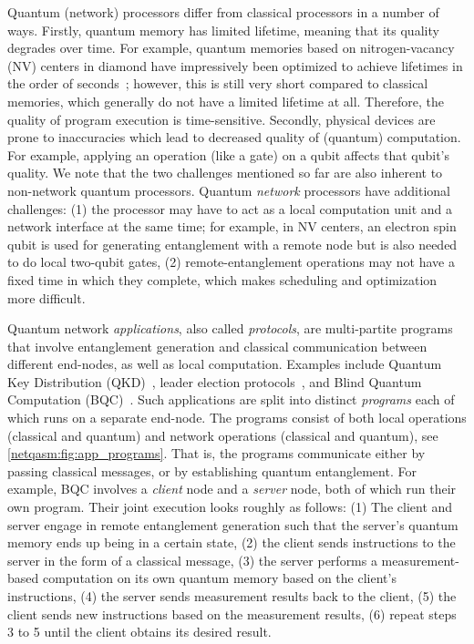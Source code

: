 Quantum (network) processors differ from classical processors in a number of ways.
Firstly, quantum memory has limited lifetime, meaning that its quality degrades over time.
For example, quantum memories based on nitrogen-vacancy (NV) centers in diamond have impressively been optimized to achieve lifetimes in the order of seconds~\cite{Abobeih2018}; however, this is still very short compared to classical memories, which generally do not have a limited lifetime at all.
Therefore, the quality of program execution is time-sensitive.
Secondly, physical devices are prone to inaccuracies which lead to decreased quality of (quantum) computation.
For example, applying an operation (like a gate) on a qubit affects that qubit's quality.
We note that the two challenges mentioned so far are also inherent to non-network quantum processors.
Quantum \textit{network} processors have additional challenges:
(1) the processor may have to act as a local computation unit and a network interface at the same time;
for example, in NV centers, an electron spin qubit is used for generating entanglement with a remote node but is also needed to do local two-qubit gates,
(2) remote-entanglement operations may not have a fixed time in which they complete, which makes scheduling and optimization more difficult.

Quantum network \textit{applications}, also called \textit{protocols}, are multi-partite programs that involve entanglement generation and classical communication between different end-nodes, as well as local computation.
Examples include Quantum Key Distribution (QKD)~\cite{bb84, ekert1991quantum}, leader election protocols~\cite{kobayashi2014simpler, ganz2009quantum}, and Blind Quantum Computation (BQC)~\cite{Wehner2018stages}.
Such applications are split into distinct \textit{programs} each of which runs on a separate end-node.
The programs consist of both local operations (classical and quantum) and network operations (classical and quantum), see \cref{netqasm:fig:app_programs}.
That is, the programs communicate either by passing classical messages, or by establishing quantum entanglement.
For example, BQC involves a \textit{client} node and a \textit{server} node, both of which run their own program.
Their joint execution looks roughly as follows:
(1) The client and server engage in remote entanglement generation such that the server's quantum memory ends up being in a certain state,
(2) the client sends instructions to the server in the form of a classical message,
(3) the server performs a measurement-based computation on its own quantum memory based on the client's instructions,
(4) the server sends measurement results back to the client,
(5) the client sends new instructions based on the measurement results,
(6) repeat steps 3 to 5 until the client obtains its desired result.

